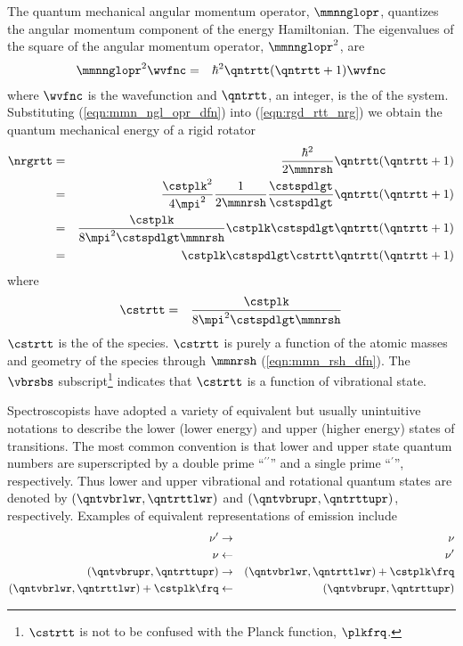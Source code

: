 \documentclass[12pt]{article}
\begin{document}
The quantum mechanical angular momentum operator, $\mmnnglopr$, 
quantizes the angular momentum component of the energy Hamiltonian.
The eigenvalues of the square of the angular momentum operator, 
$\mmnnglopr^{2}$, are 
\begin{eqnarray}
\mmnnglopr^{2} \wvfnc & = & \hbar^{2} \qntrtt (\qntrtt + 1) \wvfnc
\label{eqn:mmn_ngl_opr_dfn}
\end{eqnarray}
where $\wvfnc$ is the wavefunction and $\qntrtt$, an integer, is the 
 of the system. 
Substituting (\ref{eqn:mmn_ngl_opr_dfn}) into (\ref{eqn:rgd_rtt_nrg})
we obtain the quantum mechanical energy of a rigid rotator
\begin{eqnarray}
\nrgrtt & = & \frac{\hbar^{2}}{2\mmnrsh} \qntrtt (\qntrtt + 1) 
\nonumber \\
& = & \frac{\cstplk^{2}}{4\mpi^{2}} \frac{1}{2\mmnrsh}
\frac{\cstspdlgt}{\cstspdlgt} \qntrtt (\qntrtt + 1) \nonumber \\
& = & \frac{\cstplk}{8\mpi^{2} \cstspdlgt \mmnrsh} 
\cstplk \cstspdlgt \qntrtt (\qntrtt + 1) \nonumber \\
& = & \cstplk \cstspdlgt \cstrtt \qntrtt (\qntrtt + 1)
\label{eqn:nrg_rtt_dfn}
\end{eqnarray}
where
\begin{eqnarray}
\cstrtt & = & \frac{\cstplk}{8\mpi^{2} \cstspdlgt \mmnrsh}
\label{eqn:cst_rtt_dfn}
\end{eqnarray}
$\cstrtt$ is the  of the species.
$\cstrtt$ is purely a function of the atomic masses and geometry of
the species through $\mmnrsh$ (\ref{eqn:mmn_rsh_dfn}).
The $\vbrsbs$ subscript\footnote{$\cstrtt$ is not to be confused with
the Planck function, $\plkfrq$.} indicates that $\cstrtt$ is a
function of vibrational state.

Spectroscopists have adopted a variety of equivalent but usually
unintuitive notations to describe the lower (lower energy) and upper
(higher energy) states of transitions. 
The most common convention is that lower and upper state quantum
numbers are superscripted by a double prime ``$^{\prime\prime}$'' and  
a single prime ``$^{\prime}$'', respectively.
Thus lower and upper vibrational and rotational quantum states are
denoted by $(\qntvbrlwr,\qntrttlwr)$ and $(\qntvbrupr,\qntrttupr)$,
respectively.
Examples of equivalent representations of emission include
\begin{eqnarray}
\nu^{\prime} & \rightarrow & \nu \nonumber \\
\nu & \leftarrow & \nu^{\prime} \nonumber \\
(\qntvbrupr,\qntrttupr) & \rightarrow & (\qntvbrlwr,\qntrttlwr) +
\cstplk \frq \nonumber \\
(\qntvbrlwr,\qntrttlwr) + \cstplk \frq & \leftarrow &
(\qntvbrupr,\qntrttupr) 
\label{eqn:qnt_trn_dfn}
\end{eqnarray}
\end{document}
